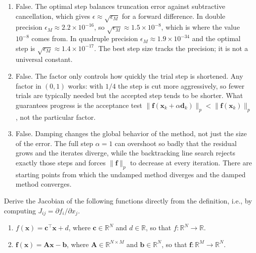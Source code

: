 \begin{solution}
\begin{enumerate}[label=(\alph*)]
        Second, and more importantly, the order is an \emph{asymptotic} statement, a claim about the limit $k \to \infty$. It constrains the iterates only once they are close enough to the root, and says nothing about any particular iteration. Each step reduces the error at all only once $C\|\mathbf{e}_k\| < 1$, and at least halves it only once $C\|\mathbf{e}_k\| < 1/2$. Before that, the error can grow: a method that is ultimately quadratically convergent can still take early steps that move it further from the root, which is precisely the behavior damping exists to control.
        \item False. The optimal step balances truncation error against subtractive cancellation, which gives $\epsilon \approx \sqrt{\epsilon_M}$ for a forward difference. In double precision $\epsilon_M \approx 2.2 \times 10^{-16}$, so $\sqrt{\epsilon_M} \approx 1.5 \times 10^{-8}$, which is where the value $10^{-8}$ comes from. In quadruple precision $\epsilon_M \approx 1.9 \times 10^{-34}$ and the optimal step is $\sqrt{\epsilon_M} \approx 1.4 \times 10^{-17}$. The best step size tracks the precision; it is not a universal constant.
        \item False. The factor only controls how quickly the trial step is shortened. Any factor in $(0,1)$ works: with $1/4$ the step is cut more aggressively, so fewer trials are typically needed but the accepted step tends to be shorter. What guarantees progress is the acceptance test $\|\mathbf{f}(\mathbf{x}_k + \alpha\mathbf{d}_k)\|_p < \|\mathbf{f}(\mathbf{x}_k)\|_p$, not the particular factor.
        \item False. Damping changes the global behavior of the method, not just the size of the error. The full step $\alpha = 1$ can overshoot so badly that the residual grows and the iterates diverge, while the backtracking line search rejects exactly those steps and forces $\|\mathbf{f}\|_p$ to decrease at every iteration. There are starting points from which the undamped method diverges and the damped method converges.
    \end{enumerate}
    
\end{solution}

\begin{exercise} %
    
    Derive the Jacobian of the following functions directly from the definition, i.e., by computing $J_{ij} = \partial f_i / \partial x_j$.
    \begin{enumerate}[label=(\alph*)]
        \item $f(\mathbf{x}) = \mathbf{c}^\top \mathbf{x} + d$, where $\mathbf{c} \in \mathbb{R}^N$ and $d \in \mathbb{R}$, so that $f : \mathbb{R}^N \to \mathbb{R}$.
        \item $\mathbf{f}(\mathbf{x}) = \mathbf{A}\mathbf{x} - \mathbf{b}$, where $\mathbf{A} \in \mathbb{R}^{N \times M}$ and $\mathbf{b} \in \mathbb{R}^N$, so that $\mathbf{f} : \mathbb{R}^M \to \mathbb{R}^N$.
    \end{enumerate}
    
\end{exercise}

